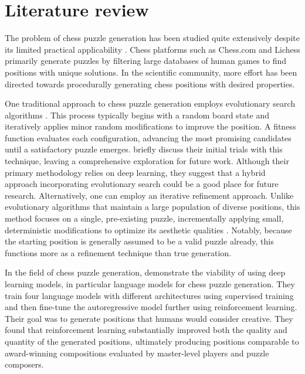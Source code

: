 \section{Literature review}
\label{sec:literature review}


The problem of chess puzzle generation has been studied quite extensively despite its limited practical applicability \cite{feng2025generatingcreativechesspuzzles, iqbal2021acomputationalmethodofoptimizingchesscompositions, iqbal2017computercomposesfabledproblem}. Chess platforms such as Chess.com and Lichess primarily generate puzzles by filtering large databases of human games to find positions with unique solutions. In the scientific community, more effort has been directed towards procedurally generating chess positions with desired properties.

One traditional approach to chess puzzle generation employs evolutionary search algorithms \cite{feng2025generatingcreativechesspuzzles}. This process typically begins with a random board state and iteratively applies minor random modifications to improve the position. A fitness function evaluates each configuration, advancing the most promising candidates until a satisfactory puzzle emerges. \citeauthor{feng2025generatingcreativechesspuzzles} \cite{feng2025generatingcreativechesspuzzles} briefly discuss their initial trials with this technique, leaving a comprehensive exploration for future work. Although their primary methodology relies on deep learning, they suggest that a hybrid approach incorporating evolutionary search could be a good place for future research. Alternatively, one can employ an iterative refinement approach. Unlike evolutionary algorithms that maintain a large population of diverse positions, this method focuses on a single, pre-existing puzzle, incrementally applying small, deterministic modifications to optimize its aesthetic qualities \cite{iqbal2021acomputationalmethodofoptimizingchesscompositions, iqbal2017computercomposesfabledproblem}. Notably, because the starting position is generally assumed to be a valid puzzle already, this functions more as a refinement technique than true generation.

In the field of chess puzzle generation, \citeauthor{feng2025generatingcreativechesspuzzles} \cite{feng2025generatingcreativechesspuzzles} demonstrate the viability of using deep learning models, in particular language models for chess puzzle generation. They train four language models with different architectures using supervised training and then fine-tune the autoregressive model further using reinforcement learning. Their goal was to generate positions that humans would consider creative. They found that reinforcement learning substantially improved both the quality and quantity of the generated positions, ultimately producing positions comparable to award-winning compositions evaluated by master-level players and puzzle composers.

